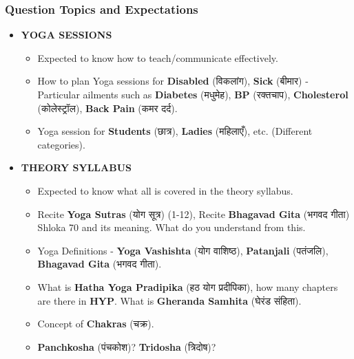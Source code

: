 \begin{frame}[fragile]\frametitle{Question Topics and Expectations}
    \begin{itemize}
        \item \textbf{YOGA SESSIONS}
        \begin{itemize}
            \item Expected to know how to teach/communicate effectively.
            \item How to plan Yoga sessions for \textbf{Disabled} (विकलांग), \textbf{Sick} (बीमार) - Particular ailments such as \textbf{Diabetes} (मधुमेह), \textbf{BP} (रक्तचाप), \textbf{Cholesterol} (कोलेस्ट्रॉल), \textbf{Back Pain} (कमर दर्द).
            \item Yoga session for \textbf{Students} (छात्र), \textbf{Ladies} (महिलाएँ), etc. (Different categories).
        \end{itemize}
        \item \textbf{THEORY SYLLABUS}
        \begin{itemize}
            \item Expected to know what all is covered in the theory syllabus.
            \item Recite \textbf{Yoga Sutras} (योग सूत्र) (1-12), Recite \textbf{Bhagavad Gita} (भगवद गीता) Shloka 70 and its meaning. What do you understand from this.
            \item Yoga Definitions - \textbf{Yoga Vashishta} (योग वाशिष्ठ), \textbf{Patanjali} (पतंजलि), \textbf{Bhagavad Gita} (भगवद गीता).
            \item What is \textbf{Hatha Yoga Pradipika} (हठ योग प्रदीपिका), how many chapters are there in \textbf{HYP}. What is \textbf{Gheranda Samhita} (घेरंड संहिता).
            \item Concept of \textbf{Chakras} (चक्र).
            \item \textbf{Panchkosha} (पंचकोश)? \textbf{Tridosha} (त्रिदोष)?
        \end{itemize}
    \end{itemize}
\end{frame}

